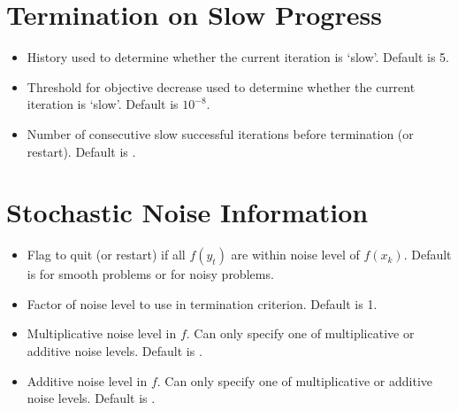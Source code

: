 \documentclass[letterpaper,10pt,english]{sphinxmanual}
\begin{document}
\section{Termination on Slow Progress}
\label{\detokenize{advanced:termination-on-slow-progress}}\begin{itemize}
\item {} 
 \sphinxhyphen{} History used to determine whether the current iteration is ‘slow’. Default is 5.

\item {} 
 \sphinxhyphen{} Threshold for objective decrease used to determine whether the current iteration is ‘slow’. Default is \(10^{-8}\).

\item {} 
 \sphinxhyphen{} Number of consecutive slow successful iterations before termination (or restart). Default is .

\end{itemize}


\section{Stochastic Noise Information}
\label{\detokenize{advanced:stochastic-noise-information}}\begin{itemize}
\item {} 
 \sphinxhyphen{} Flag to quit (or restart) if all \(f(y_t)\) are within noise level of \(f(x_k)\). Default is  for smooth problems or  for noisy problems.

\item {} 
 \sphinxhyphen{} Factor of noise level to use in termination criterion. Default is 1.

\item {} 
 \sphinxhyphen{} Multiplicative noise level in \(f\). Can only specify one of multiplicative or additive noise levels. Default is .

\item {} 
 \sphinxhyphen{} Additive noise level in \(f\). Can only specify one of multiplicative or additive noise levels. Default is .

\end{itemize}
\end{document}
